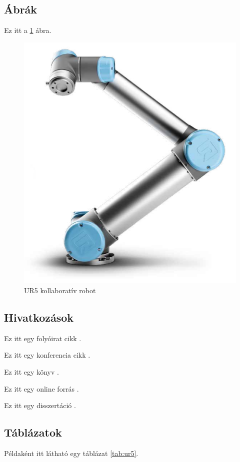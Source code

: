 \subsection{Ábrák}
	
Ez itt a \ref{fig:ur5} ábra.
\begin{figure}[H]
	\centering
	\includegraphics[width=0.5\linewidth]{img/ur5robot.png}
	\caption{UR5 kollaboratív robot}
	\label{fig:ur5}
\end{figure}


\subsection{Hivatkozások}

Ez itt egy folyóirat cikk \cite{journal-example}.

Ez itt egy konferencia cikk \cite{conference-example}.

Ez itt egy könyv \cite{book-example}.

Ez itt egy online forrás \cite{online-example}.

Ez itt egy disszertáció \cite{thesis-example}.

	
\subsection{Táblázatok}
Példaként itt látható egy táblázat \ref{tab:ur5}.

